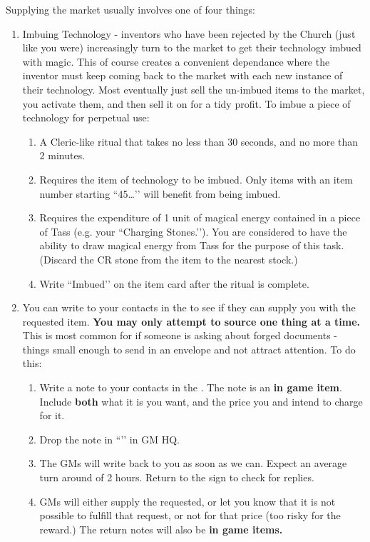 \documentclass[green]{GL2020}
\begin{document}
Supplying the market usually involves one of four things:
\begin{enumerate}
  \item Imbuing Technology - inventors who have been rejected by the Church (just like you were) increasingly turn to the market to get their technology imbued with magic. This of course creates a convenient dependance where the inventor must keep coming back to the market with each new instance of their technology. Most eventually just sell the un-imbued items to the market, you activate them, and then sell it on for a tidy profit. To imbue a piece of technology for perpetual use:
  \begin{enumerate}
    \item A Cleric-like ritual that takes no less than 30 seconds, and no more than 2 minutes.
    \item Requires the item of technology to be imbued. Only items with an item number starting ``45…’’ will benefit from being imbued.
    \item Requires the expenditure of 1 unit of magical energy contained in a piece of Tass (e.g. your ``Charging Stones.’’). You are considered to have the ability to draw magical energy from Tass for the purpose of this task. (Discard the CR stone from the item to the nearest stock.)
    \item Write ``Imbued’’ on the item card after the ritual is complete.
  \end{enumerate}
  \item You can write to your contacts in the \pTech{} to see if they can supply you with the requested item. \textbf{You may only attempt to source one thing at a time.} This is most common for if someone is asking about forged documents - things small enough to send in an envelope and not attract attention. To do this:
  \begin{enumerate}
    \item Write a note to your contacts in the \pTech{}. The note is an \textbf{in game item}. Include \textbf{both} what it is you want, and the price you and \cChupSecond{} intend to charge for it.
    \item Drop the note in ``\sSignR{}’’ in GM HQ.
    \item The GMs will write back to you as soon as we can. Expect an average turn around of 2 hours. Return to the sign to check for replies.
    \item GMs will either supply the requested, or let you know that it is not possible to fulfill that request, or not for that price (too risky for the reward.) The return notes will also be \textbf{in game items.}

\end{enumerate}
\end{enumerate}
\end{document}
